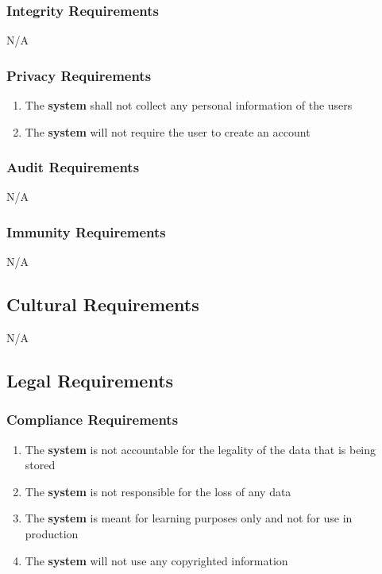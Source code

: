 \documentclass[12pt, titlepage]{article}
\begin{document}
    \subsubsection{Integrity Requirements}
        N/A
    \subsubsection{Privacy Requirements}
        \begin{enumerate}
            \item The \textbf{system} shall not collect any personal information of the users 
            \item The \textbf{system} will not require the user to create an account
        \end{enumerate}
    \subsubsection{Audit Requirements}
        N/A
    \subsubsection{Immunity Requirements}
        N/A

\subsection{Cultural Requirements}
    N/A

\subsection{Legal Requirements}
    \subsubsection{Compliance Requirements}
        \begin{enumerate}
            \item The \textbf{system} is not accountable for the legality of the data that is being stored
            \item The \textbf{system} is not responsible for the loss of any data
            \item The \textbf{system} is meant for learning purposes only and not for use in production
            \item The \textbf{system} will not use any copyrighted information
        \end{enumerate}
        
\end{document}
